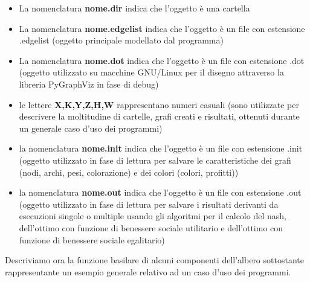 \begin{itemize}
	\item La nomenclatura \textbf{nome.dir} indica che l'oggetto è una cartella
	\item La nomenclatura \textbf{nome.edgelist} indica che l'oggetto è un file con estensione .edgelist (oggetto principale modellato dal programma)
	\item La nomenclatura \textbf{nome.dot} indica che l'oggetto è un file con estensione .dot (oggetto utilizzato su macchine GNU/Linux per il disegno attraverso la libreria PyGraphViz in fase di debug)
	\item le lettere \textbf{X,K,Y,Z,H,W} rappresentano numeri casuali (sono utilizzate per descrivere la moltitudine di cartelle, grafi creati e risultati, ottenuti durante un generale caso d'uso dei programmi)
	\item la nomenclatura \textbf{nome.init} indica che l'oggetto è un file con estensione .init (oggetto utilizzato in fase di lettura per salvare le caratteristiche dei grafi (nodi, archi, pesi, colorazione) e dei colori (colori, profitti))
	\item la nomenclatura \textbf{nome.out} indica che l'oggetto è un file con estensione .out (oggetto utilizzato in fase di lettura per salvare i risultati derivanti da esecuzioni singole o multiple usando gli algoritmi per il calcolo del nash, dell'ottimo con funzione di benessere sociale utilitario e dell'ottimo con funzione di benessere sociale egalitario)
\end{itemize}

Descriviamo ora la funzione basilare di alcuni componenti dell'albero sottostante rappresentante un esempio generale relativo ad un caso d'uso dei programmi.


